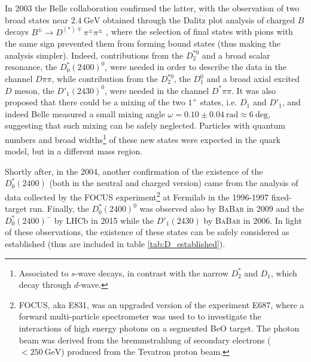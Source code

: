 In 2003 the Belle collaboration confirmed the latter, with the observation of two broad states near $2.4 \ \text{GeV}$ obtained through the Dalitz plot analysis of charged $B$ decays $B^\pm \to D^{(*) \mp} \pi^\pm \pi^\pm$ \cite{Abe:2003zm}, where the selection of final states with pions with the same sign prevented them from forming bound states (thus making the analysis simpler). Indeed, contributions from the $D_2^{* 0}$ and a broad scalar resonance, the $D^*_0(2400)^0$, were needed in order to describe the data in the channel $D \pi \pi$, while contribution from the $D_2^{* 0}$, the $D^0_1$ and a broad axial excited $D$ meson, the $D'_1(2430)^0$, were needed in the channel $D^* \pi \pi$. It was also proposed that there could be a mixing of the two $1^+$ states, i.e. $D_1$ and $D'_1$, and indeed Belle measured a small mixing angle $\omega = 0.10 \pm 0.04 \ \text{rad} \approx 6 \ \text{deg}$, suggesting that such mixing can be safely neglected. Particles with quantum numbers and broad widths\footnote{Associated to $s$-wave decays, in contrast with the narrow $D_2^*$ and $D_1$, which decay through $d$-wave.} of these new states were expected in the quark model, but in a different mass region. 

Shortly after, in the 2004, another confirmation of the existence of the $D^*_0(2400)$ (both in the neutral and charged version) came from the analysis of data collected by the FOCUS experiment\footnote{FOCUS, aka E831, was an upgraded version of the experiment E687, where a forward multi-particle spectrometer was used to to investigate the interactions of high energy photons on a segmented BeO target. The photon beam was derived from the bremmstrahlung of secondary electrons ($< 250 \ \text{GeV}$) produced from the Tevatron proton beam.} at Fermilab in the 1996-1997 fixed-target run. Finally, the $D^*_0(2400)^0$ was observed also by \textsc{BaBar} \cite{Aubert:2009wg} in 2009 and the $D^*_0(2400)^-$ by LHCb in 2015 \cite{Aaij:2015kqa,Aaij:2015sqa} while the $D'_1(2430)$ by \textsc{BaBar} \cite{Aubert:2006zb} in 2006. In light of these observations, the existence of these states can be safely considered as established (thus are included in table \ref{tab:D_established}).

